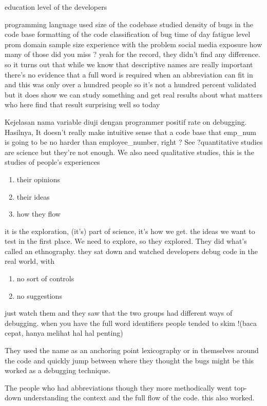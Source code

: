 \documentclass[conference, compsoc, twoside]{IEEEtran}
\begin{document}
education level of the developers

programming language used size of the
codebase studied
density of bugs in the code base 
formatting of the code
classification of bug time of day
fatigue level 
prom domain 
sample size
experience with the problem 
social media exposure
how many of those did you miss ?
yeah for the record, they didn't find any difference.
 so it turns out that while we
know that descriptive names are really
important there's no evidence that a
full word is required when an
abbreviation can fit in and this was
only over a hundred people so it's not a
hundred percent validated but it does
show we can study something and get real
results about what matters who here find
that result surprising well so today 

Kejelasan nama variable diuji dengan programmer positif rate on debugging. Hasilnya, It doesn’t really make intuitive sense that a code base that emp\_num is going to be no harder than employee\_number, right ? See ?quantitative studies are science but they’re not enough.
We also need qualitative studies, this is the studies of people’s experiences
\begin{enumerate}
\item their opinions
\item their ideas
\item how they flow
\end{enumerate}

it is the exploration, (it's) part of science, it’s how we get. 
the ideas we want to test in the first place.
We need to explore, so they explored. 
They did what’s called an ethnography.
they sat down and watched developers debug code in the real world, with 
\begin{enumerate}
\item no sort of controls
\item no suggestions 
\end{enumerate}
just watch them and they saw that the two groups had different ways of debugging.
when you have the full word identifiers
people tended to skim !(baca cepat, hanya melihat hal hal penting) 

They used the name as an anchoring point lexicography or in themselves around the code and
quickly jump between where they thought the bugs might be this worked as a debugging technique.
 
The people who had abbreviations though they more methodically went top-down understanding the context and the full flow of the code. 
this also worked.
\end{document}
